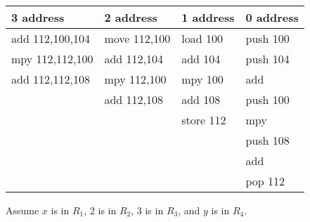 \begin{tabular}{llll} \hline
  3 address       & 2 address    & 1 address & 0 address \\ \hline
  add 112,100,104 & move 112,100 & load 100  & push 100 \\
  mpy 112,112,100 & add 112,104  & add 104   & push 104 \\
  add 112,112,108 & mpy 112,100  & mpy 100   & add \\
                  & add 112,108  & add 108   & push 100 \\
                  &              & store 112 & mpy \\
                  &              &           & push 108 \\
                  &              &           & add \\
                  &              &           & pop 112 \\ \hline
\end{tabular}
\vspace{.1in}


Assume $x$ is in $R_1$, $2$ is in $R_2$, $3$ is in $R_3$, and $y$
is in $R_4$. 